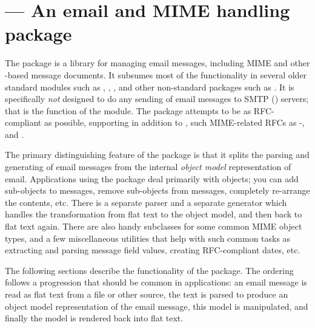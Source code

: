 
\section{ ---
	 An email and MIME handling package}



The  package is a library for managing email messages,
including MIME and other -based message documents.  It
subsumes most of the functionality in several older standard modules
such as , ,
, and other non-standard packages such as
.  It is specifically \emph{not} designed to do any
sending of email messages to SMTP () servers; that is the
function of the  module.  The 
package attempts to be as RFC-compliant as possible, supporting in
addition to , such MIME-related RFCs as
-, and .

The primary distinguishing feature of the  package is
that it splits the parsing and generating of email messages from the
internal \emph{object model} representation of email.  Applications
using the  package deal primarily with objects; you can
add sub-objects to messages, remove sub-objects from messages,
completely re-arrange the contents, etc.  There is a separate parser
and a separate generator which handles the transformation from flat
text to the object model, and then back to flat text again.  There
are also handy subclasses for some common MIME object types, and a few
miscellaneous utilities that help with such common tasks as extracting
and parsing message field values, creating RFC-compliant dates, etc.

The following sections describe the functionality of the
 package.  The ordering follows a progression that
should be common in applications: an email message is read as flat
text from a file or other source, the text is parsed to produce an
object model representation of the email message, this model is
manipulated, and finally the model is rendered back into
flat text.

